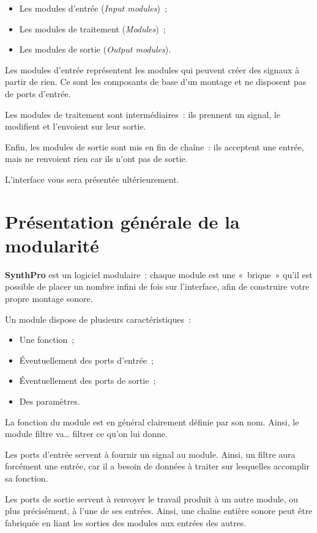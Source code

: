 \documentclass[a4paper,oneside,frenchb,10pt]{article}
\begin{document}
\begin{itemize}
\item
  Les modules d'entrée (\emph{Input modules})~;
\item
  Les modules de traitement (\emph{Modules})~;
\item
  Les modules de sortie (\emph{Output modules}).
\end{itemize}

Les modules d'entrée représentent les modules qui peuvent créer des
signaux à partir de rien. Ce sont les composants de base d'un montage et
ne disposent pas de ports d'entrée.

Les modules de traitement sont intermédiaires~: ils prennent un signal,
le modifient et l’envoient sur leur sortie.

Enfin, les modules de sortie sont mis en fin de chaîne~: ils acceptent
une entrée, mais ne renvoient rien car ils n'ont pas de sortie.

L'interface vous sera présentée ultérieurement.

\section{Présentation générale de la modularité}

\textbf{SynthPro} est un logiciel modulaire~: chaque module est une «~brique~»
qu'il est possible de placer un nombre infini de fois sur l'interface,
afin de construire votre propre montage sonore.

Un module dispose de plusieurs caractéristiques~:

\begin{itemize}
\item
  Une fonction~;
\item
  Éventuellement des ports d'entrée~;
\item
  Éventuellement des ports de sortie~;
\item
  Des paramètres.
\end{itemize}
La fonction du module est en général clairement définie par son nom.
Ainsi, le module filtre va\ldots{} filtrer ce qu'on lui donne.

Les ports d'entrée servent à fournir un signal au module. Ainsi, un
filtre aura forcément une entrée, car il a besoin de données à traiter
sur lesquelles accomplir sa fonction.

Les ports de sortie servent à renvoyer le travail produit à un autre
module, ou plus précisément, à l'une de ses entrées. Ainsi, une chaîne
entière sonore peut être fabriquée en liant les sorties des modules aux
entrées des autres.
\end{document}
